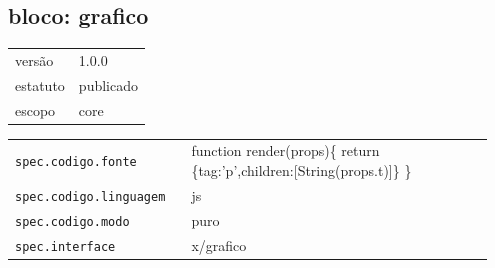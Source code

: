 \subsection*{bloco: grafico}
\begin{tabular}{@{}ll@{}}
versão & 1.0.0 \\
estatuto & publicado \\
escopo & core \\
\end{tabular}

\begin{tabular}{@{}p{0.35\linewidth}p{0.6\linewidth}@{}}
\texttt{spec.codigo.fonte} & function render(props)\{ return \{tag:'p',children:[String(props.t)]\} \} \\
\texttt{spec.codigo.linguagem} & js \\
\texttt{spec.codigo.modo} & puro \\
\texttt{spec.interface} & x/grafico \\
\end{tabular}

